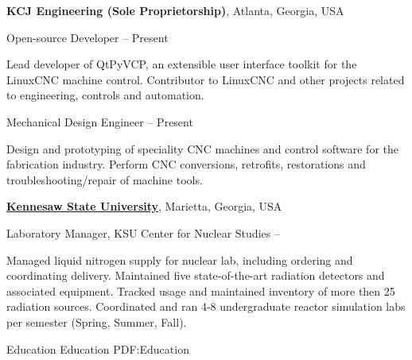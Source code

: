 \documentclass[
letterpaper,
MMMyyyy,
nonstopmode,
draftmode,
]{resume}
\begin{document}
\begin{Body}
\BigGap


\Entry
\textbf{KCJ Engineering (Sole Proprietorship)},
Atlanta, Georgia, USA

\Gap
\BulletItem
Open-source Developer
\hfill
{} --
Present
\begin{Detail}
\SubBulletItem
Lead developer of QtPyVCP, an extensible user interface toolkit for the LinuxCNC machine control.
\SubBulletItem
Contributor to LinuxCNC and other projects related to engineering, controls and automation.
\end{Detail}

\Gap
\BulletItem
Mechanical Design Engineer
\hfill
{} --
Present
\begin{Detail}
\SubBulletItem
Design and prototyping of speciality CNC machines and control software for the fabrication industry.
\SubBulletItem
Perform CNC conversions, retrofits, restorations and troubleshooting/repair of machine tools.
\end{Detail}

\BigGap

\Entry
\href{http://kennesaw.edu/}
{\textbf{Kennesaw State University}},
Marietta, Georgia, USA

\Gap
\BulletItem
Laboratory Manager,
KSU Center for Nuclear Studies
\hfill
{} --
\begin{Detail}
\SubBulletItem
Managed liquid nitrogen supply for nuclear lab, including ordering and coordinating delivery.
\SubBulletItem
Maintained five state-of-the-art radiation detectors and associated equipment.
\SubBulletItem
Tracked usage and maintained inventory of more then 25 radiation sources.
\SubBulletItem
Coordinated and ran 4-8 undergraduate reactor simulation labs per semester (Spring, Summer, Fall).
\end{Detail}


%



\Section
{Education}
{Education}
{PDF:Education}


\end{Body}
\end{document}
